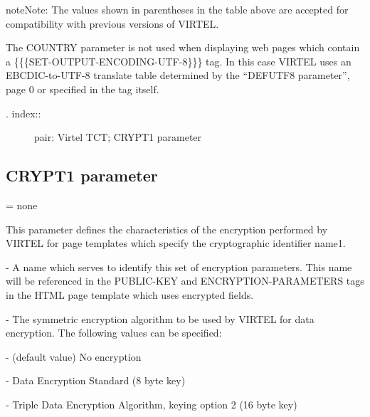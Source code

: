 \documentclass[letterpaper,10pt,english]{sphinxmanual}
\begin{document}
\begin{sphinxadmonition}{note}{Note:}
The values shown in parentheses in the table above are accepted for compatibility with previous versions of VIRTEL.
\end{sphinxadmonition}

The COUNTRY parameter is not used when displaying web pages which contain a \{\{\{SET-OUTPUT-ENCODING-UTF-8\}\}\} tag. In this case VIRTEL uses an EBCDIC-to-UTF-8 translate table determined by the “DEFUTF8 parameter”, page 0 or specified in the tag itself.
\begin{description}
\item[{. index::}] \leavevmode
pair: Virtel TCT; CRYPT1 parameter

\end{description}


\subsection{CRYPT1 parameter}
\label{\detokenize{Installation_Guide:crypt1-parameter}}
\begin{sphinxVerbatim}[commandchars=\\\{\}]
\PYG{p}{[}\PYG{p}{]}\PYG{p}{[}\PYG{p}{]}\PYG{p}{[}\PYG{p}{]}\PYG{p}{[}\PYG{p}{]}\PYG{p}{[}\PYG{p}{]}\PYG{p}{[}\PYG{p}{]}
\end{sphinxVerbatim}

 = none

This parameter defines the characteristics of the encryption performed by VIRTEL for page templates which specify the cryptographic identifier name1.

 - A name which serves to identify this set of encryption parameters. This name will be referenced in the PUBLIC-KEY and ENCRYPTION-PARAMETERS tags in the HTML page template which uses encrypted fields.

 - The symmetric encryption algorithm to be used by VIRTEL for data encryption. The following values can be specified:

 - (default value) No encryption

 - Data Encryption Standard (8 byte key)

 - Triple Data Encryption Algorithm, keying option 2 (16 byte key)
\end{document}
